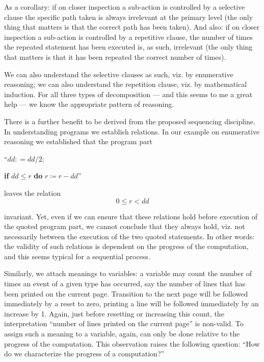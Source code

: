 As a corollary: if on closer inspection a sub-action is controlled by a selective clause the specific path taken is always irrelevant at the primary level (the only thing that matters is that the correct path has been taken). And also: if on closer inspection a sub-action is controlled by a repetitive clause, the number of times the repeated statement has been executed is, as such, irrelevant (the only thing that matters is that it has been repeated the correct number of times).

We can also understand the selective clauses as such, viz. by enumerative reasoning; we can also understand the repetition clause, viz. by mathematical induction. For all three types of decomposition --- and this seems to me a great help --- we know the appropriate pattern of reasoning.

There is a further benefit to be derived from the proposed sequencing discipline. In understanding programs we establish relations. In our example on enumerative reasoning we established that the program part
\medskip

{
	\setlength{\parindent}{8em}
	\hspace{-.4em}``$dd: = dd/2;$
	
	\textbf{if} $dd \leqslant r$ \textbf{do} $r \coloneq r - dd$''
}
\medskip

\noindent
leaves the relation
$$
0 \leqslant r < dd
$$

\noindent
invariant. Yet, even if we can ensure that these relations hold before execution of the quoted program part, we cannot conclude that they always hold, viz. not necessarily between the execution of the two quoted statements. In other words: the validity of such relations is dependent on the progress of the computation, and this seems typical for a sequential process.

Similarly, we attach meanings to variables: a variable may count the number of times an event of a given type has occurred, say the number of lines that has been printed on the current page. Transition to the next page will be followed immediately by a reset to zero, printing a line will be followed immediately by an increase by 1. Again, just before resetting or increasing this count, the interpretation ``number of lines printed on the current page'' is non-valid. To assign such a meaning to a variable, again, can only be done relative to the progress of the computation. This observation raises the following question: ``How do we characterize the progress of a computation?''


